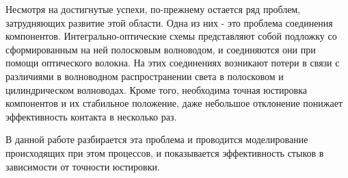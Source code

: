 Несмотря на достигнутые успехи, по-прежнему остается ряд проблем, затрудняющих развитие этой области. Одна из них - это проблема соединения компонентов. Интегрально-оптические схемы представляют собой подложку со сформированным на ней полосковым волноводом, и соединяются они при помощи оптического волокна. На этих соединениях возникают потери в связи с различиями в волноводном  распространении света в полосковом и цилиндрическом волноводах. Кроме того, необходима точная юстировка компонентов и их стабильное положение, даже небольшое отклонение понижает эффективность контакта в несколько раз. 

В данной работе разбирается эта проблема и проводится моделирование происходящих при этом процессов, и показывается эффективность стыков в зависимости от точности юстировки.